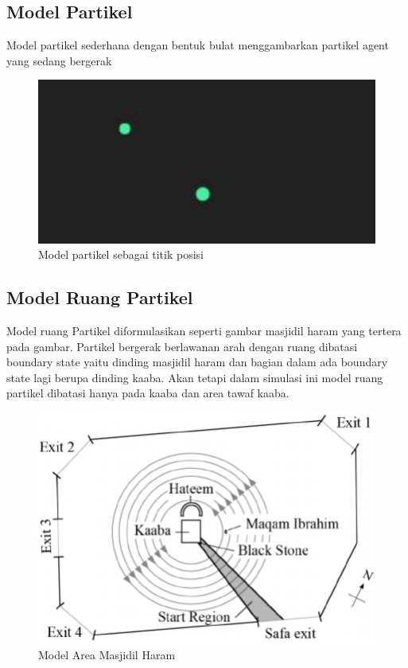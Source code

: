 \subsection{Model Partikel}\label{sec:modelpartikel}
\hspace {0.5cm}Model partikel sederhana dengan bentuk bulat menggambarkan partikel agent yang sedang bergerak
\begin{figure}
\centering
\includegraphics[scale=0.3]{gambar/ModelPartikel.JPG}
\caption{Model partikel sebagai titik posisi}
\end{figure}


\subsection{Model Ruang Partikel}\label{sec:ruangpartikel}

\hspace {0.5cm}Model ruang Partikel diformulasikan seperti gambar masjidil haram yang tertera pada gambar. Partikel bergerak berlawanan arah dengan ruang dibatasi boundary state yaitu dinding masjidil haram dan bagian dalam ada boundary state lagi berupa dinding kaaba. Akan tetapi dalam simulasi ini model ruang partikel dibatasi hanya pada kaaba dan area tawaf kaaba.
\begin{figure}
\centering
\includegraphics[scale=0.5]{gambar/layout2dmasjidilharam}
\caption{Model Area Masjidil Haram}
\end{figure}

